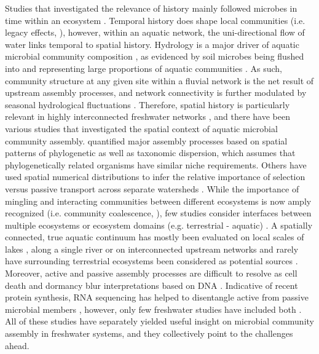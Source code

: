 \documentclass[12pt,a4paper]{article} %
\begin{document}
Studies that investigated the relevance of history mainly followed microbes in time within an ecosystem \citep{Shade2015b}. Temporal history does shape local communities (i.e. legacy effects, \citet{Fukami2015a}), however, within an aquatic network, the uni-directional flow of water links temporal to spatial history. Hydrology is a major driver of aquatic microbial community composition \citep{Nino-Garcia2016}, as evidenced by soil microbes being flushed into and representing large proportions of aquatic communities \citep{Ruiz-Gonzalez2015, Hauptmann2016, Crump2012, Besemer2013, Wisnoski2020}. As such, community structure at any given site within a fluvial network is the net result of upstream assembly processes, and network connectivity is further modulated by seasonal hydrological fluctuations \citep{deMelo2019, Caillon2021}. Therefore, spatial history is particularly relevant in highly interconnected freshwater networks \citep{Vass2017}, and there have been various studies that investigated the spatial context of aquatic microbial community assembly. \citet{Stegen2013a} quantified major assembly processes based on spatial patterns of phylogenetic as well as taxonomic dispersion, which assumes that phylogenetically related organisms have similar niche requirements. Others have used spatial numerical distributions to infer the relative importance of selection versus passive transport across separate watersheds \citep{Nino-Garcia2016b}. While the importance of mingling and interacting communities between different ecosystems is now amply recognized (i.e. community coalescence, \citet{Mansour2018}), few studies consider interfaces between multiple ecosystems or ecosystem domains (e.g. terrestrial - aquatic) \citep{Nemergut2011, Shade2013}. A spatially connected, true aquatic continuum has mostly been evaluated on local scales of lakes \citep{Logue2010, Adams2014, Langenheder2017}, along a single river \citep{Winter2007, Savio2015a, Hauptmann2016, Doherty2017, Gweon2020} or on interconnected upstream networks \citep{Besemer2013, Widder2014, Read2015, Hassell2018, Wisnoski2020a} and rarely have surrounding terrestrial ecosystems been considered as potential sources \citep{Crump2012, Ruiz-Gonzalez2015, Wisnoski2020}. Moreover, active and passive assembly processes are difficult to resolve as cell death and dormancy blur interpretations based on DNA \citep{Cole1999, Jones2010}. Indicative of recent protein synthesis, RNA sequencing has helped to disentangle active from passive microbial members \citep{Bowsher2019}, however, only few freshwater studies have included both \citep{Logue2010, Szekely2013, Aanderud2016, Peter2018, Wisnoski2020}. All of these studies have separately yielded useful insight on microbial community assembly in freshwater systems, and they collectively point to the challenges ahead.
\end{document}
